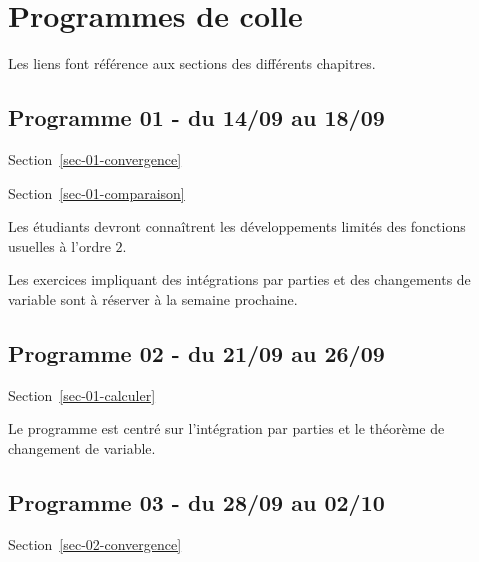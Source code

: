 \documentclass[
  french,
  letterpaper,
  DIV=11,
  numbers=noendperiod]{scrreprt}
\theoremstyle{plain}
\theoremstyle{definition}
\theoremstyle{plain}
\theoremstyle{plain}
\theoremstyle{definition}
\theoremstyle{definition}
\theoremstyle{plain}
\theoremstyle{remark}
\begin{document}

\chapter*{Programmes de colle}\label{programmes-de-colle}


Les liens font référence aux sections des différents chapitres.

\section*{Programme 01 - du 14/09 au
18/09}\label{programme-01---du-1409-au-1809}


Section~\ref{sec-01-convergence}

Section~\ref{sec-01-comparaison}

Les étudiants devront connaîtrent les développements limités des
fonctions usuelles à l'ordre \(2\).

Les exercices impliquant des intégrations par parties et des changements
de variable sont à réserver à la semaine prochaine.

\section*{Programme 02 - du 21/09 au
26/09}\label{programme-02---du-2109-au-2609}


Section~\ref{sec-01-calculer}

Le programme est centré sur l'intégration par parties et le théorème de
changement de variable.

\section*{Programme 03 - du 28/09 au
02/10}\label{programme-03---du-2809-au-0210}


Section~\ref{sec-02-convergence}
\end{document}

